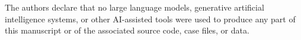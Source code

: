%
%

\noindent The authors declare that no large language models, generative artificial
intelligence systems, or other AI-assisted tools were used to produce any
part of this manuscript or of the associated source code, case files, or
data.

